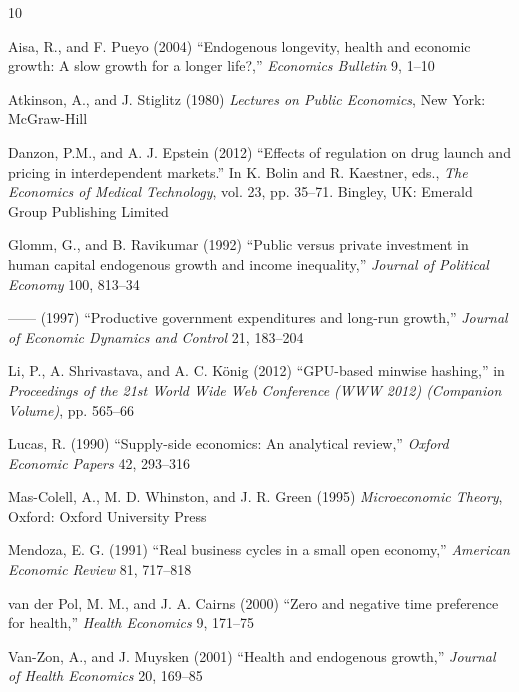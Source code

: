 \documentclass{cje}          %
\theoremstyle{plain}%
\theoremstyle{definition}
\theoremstyle{remark}
\begin{document}
\begin{smallverbatim}
\begin{thebibliography}{10}
\newcommand{\enquote}[1]{``#1''}

Aisa, R., and F. Pueyo (2004) \enquote{Endogenous longevity, health and
  economic growth: A slow growth for a longer life?,} \emph{Economics 
  Bulletin} 9, 1--10

Atkinson, A., and J. Stiglitz (1980) \emph{Lectures on Public Economics}, 
  New York: McGraw-Hill

Danzon, P.M., and A. J. Epstein (2012)  \enquote{Effects of regulation on
drug launch and pricing in interdependent markets.} In K. Bolin
and R. Kaestner, eds., \emph{The Economics of Medical Technology}, vol. 23, 
pp. 35--71.  Bingley, UK: Emerald Group Publishing Limited 

Glomm, G., and B. Ravikumar (1992) \enquote{Public versus private 
  investment in human capital endogenous growth and income inequality,} 
  \emph{Journal of Political Economy} 100, 813--34

------ (1997) \enquote{Productive government expenditures and long-run 
  growth,} \emph{Journal of Economic Dynamics and Control} 21, 183--204

Li, P., A. Shrivastava, and A. C. K{\"o}nig (2012) \enquote{{GPU}-based 
  minwise hashing,} in \emph{Proceedings of the 21st World Wide Web 
  Conference (WWW 2012) (Companion Volume)}, pp. 565--66

Lucas, R. (1990) \enquote{Supply-side economics: An analytical review,}
  \emph{Oxford Economic Papers} 42, 293--316

Mas-Colell, A., M. D. Whinston, and J. R. Green (1995) \emph{Microeconomic
  Theory}, Oxford: Oxford University Press

Mendoza, E. G. (1991) \enquote{Real business cycles in a small open economy,}
  \emph{American Economic Review} 81, 717--818

van der Pol, M. M., and J. A. Cairns (2000) \enquote{Zero and negative time
  preference for health,} \emph{Health Economics} 9, 171--75

Van-Zon, A., and J. Muysken (2001) \enquote{Health and endogenous growth,}
  \emph{Journal of Health Economics} 20, 169--85

\end{thebibliography}
\end{smallverbatim}
\end{document}
